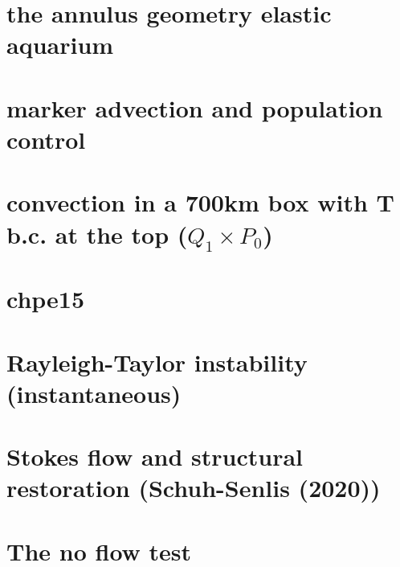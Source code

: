 \documentclass[a4paper,11pt]{report}
\begin{document}
\chapter{the annulus geometry elastic aquarium \label{f36}}%

\chapter{marker advection and population control \label{f37}} %

\chapter{convection in a 700km box with T b.c. at the top  ($Q_1\times P_0$) \label{f38}} %

\chapter{chpe15 \label{f39}} %

\chapter{Rayleigh-Taylor instability (instantaneous) \label{f40}} %

\chapter{Stokes flow and structural restoration (Schuh-Senlis \etal (2020))\label{f41}} %

\chapter{The no flow test \label{f42}} %
\end{document}
